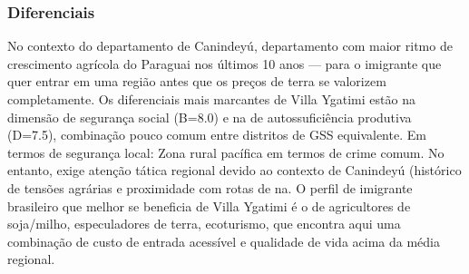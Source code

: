 \subsubsection*{Diferenciais}\label{dif-villa-ygatimi-1404}
No contexto do departamento de Canindeyú, departamento com maior ritmo de crescimento agrícola do Paraguai nos últimos 10 anos — para o imigrante que quer entrar em uma região antes que os preços de terra se valorizem completamente. Os diferenciais mais marcantes de Villa Ygatimi estão na dimensão de segurança social (B=8.0) e na de autossuficiência produtiva (D=7.5), combinação pouco comum entre distritos de GSS equivalente. Em termos de segurança local: Zona rural pacífica em termos de crime comum. No entanto, exige atenção tática regional devido ao contexto de Canindeyú (histórico de tensões agrárias e proximidade com rotas de na. O perfil de imigrante brasileiro que melhor se beneficia de Villa Ygatimi é o de agricultores de soja/milho, especuladores de terra, ecoturismo, que encontra aqui uma combinação de custo de entrada acessível e qualidade de vida acima da média regional.
